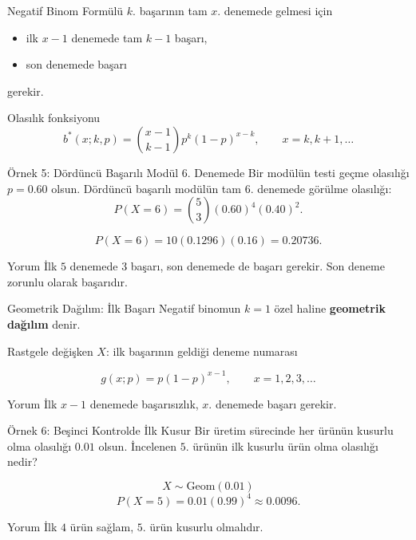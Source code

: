 \documentclass[light]{lutbeamer}
\begin{document}
\begin{frame}{Negatif Binom Formülü}
    \small
    \(k\). başarının tam \(x\). denemede gelmesi için
    \begin{itemize}
        \item ilk \(x-1\) denemede tam \(k-1\) başarı,
        \item son denemede başarı
    \end{itemize}
    gerekir.

    \begin{block}{Olasılık fonksiyonu}
        \[
        b^{\ast}(x;k,p)=\binom{x-1}{k-1}p^k(1-p)^{x-k},
        \qquad x=k,k+1,\dots
        \]
    \end{block}
\end{frame}

\begin{frame}{Örnek 5: Dördüncü Başarılı Modül 6. Denemede}
    \small
    Bir modülün testi geçme olasılığı \(p=0.60\) olsun. Dördüncü başarılı modülün tam \(6\). denemede görülme olasılığı:
    \[
    P(X=6)=\binom{5}{3}(0.60)^4(0.40)^2.
    \]

    \[
    P(X=6)=10(0.1296)(0.16)=0.20736.
    \]

    \begin{exampleblock}{Yorum}
        İlk \(5\) denemede \(3\) başarı, son denemede de başarı gerekir. Son deneme zorunlu olarak başarıdır.
    \end{exampleblock}
\end{frame}

\begin{frame}{Geometrik Dağılım: İlk Başarı}
    \small
    Negatif binomun \(k=1\) özel haline \textbf{geometrik dağılım} denir.

    \begin{block}{Rastgele değişken}
        \(X\): ilk başarının geldiği deneme numarası
    \end{block}

    \[
    g(x;p)=p(1-p)^{x-1}, \qquad x=1,2,3,\dots
    \]

    \begin{alertblock}{Yorum}
        İlk \(x-1\) denemede başarısızlık, \(x\). denemede başarı gerekir.
    \end{alertblock}
\end{frame}

\begin{frame}{Örnek 6: Beşinci Kontrolde İlk Kusur}
    \small
    Bir üretim sürecinde her ürünün kusurlu olma olasılığı \(0.01\) olsun. İncelenen \(5\). ürünün ilk kusurlu ürün olma olasılığı nedir?

    \[
    X \sim \text{Geom}(0.01)
    \]
    \[
    P(X=5)=0.01(0.99)^4\approx 0.0096.
    \]

    \begin{exampleblock}{Yorum}
        İlk \(4\) ürün sağlam, \(5\). ürün kusurlu olmalıdır.
    \end{exampleblock}
\end{frame}
\end{document}
